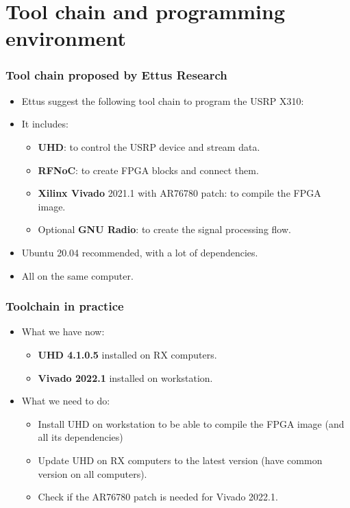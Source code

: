 \documentclass[11pt]{beamer}
\begin{document}

\section{Tool chain and programming environment}

\begin{frame}
    \frametitle{Tool chain proposed by Ettus Research}
    \begin{itemize}
        \item Ettus suggest the following tool chain to program the USRP X310:
        \item It includes:
        \begin{itemize}
            \item \textbf{UHD}: to control the USRP device and stream data.
            \item \textbf{RFNoC}: to create FPGA blocks and connect them.
            \item \textbf{Xilinx Vivado} 2021.1 with AR76780 patch: to compile the FPGA image.
            \item Optional \textbf{GNU Radio}: to create the signal processing flow.
        \end{itemize}
        \item Ubuntu 20.04 recommended, with a lot of dependencies.
        \item All on the same computer.
    \end{itemize}
\end{frame}

\begin{frame}
    \frametitle{Toolchain in practice}
    \begin{itemize}
        \item What we have now:
        \begin{itemize}
            \item \textbf{UHD 4.1.0.5} installed on RX computers.
            \item \textbf{Vivado 2022.1} installed on workstation.
        \end{itemize}
        \item What we need to do:
        \begin{itemize}
            \item Install UHD on workstation to be able to compile the FPGA image (and all its dependencies)
            \item Update UHD on RX computers to the latest version (have common version on all computers).
            \item Check if the AR76780 patch is needed for Vivado 2022.1.
        \end{itemize}
    \end{itemize}
\end{frame}
\end{document}
